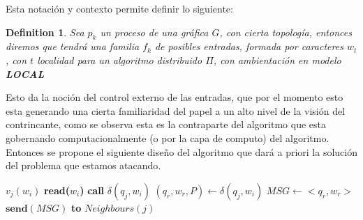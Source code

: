 \documentclass[10pt]{report}
\newtheorem{definition}{Definition}
\begin{document}
    Esta notación y contexto permite definir lo siguiente:
    \theoremstyle{definition}
    \begin{definition}
        Sea $p_{k}$ un proceso de una gráfica $G$, con cierta topología, entonces
        diremos que tendrá una familia $f_{k}$ de posibles entradas, formada por caracteres $w_{t}$, con $t$ localidad para un algoritmo
        distribuido $\Pi$, con ambientación en modelo \textbf{LOCAL}

    \end{definition}
    Esto da la noción del control externo de las entradas, que por el momento esto esta generando
    una cierta familiaridad del papel a un alto nivel de la visión del contrincante, como se observa
    esta es la contraparte del algoritmo que esta gobernando computacionalmente (o por la capa de computo)
    del algoritmo.
    \hfill
    Entonces se propone el siguiente diseño del algoritmo que dará a priori
    la solución del problema que estamos atacando.

    \begin{algorithm}
        \caption{$Simula\char95Algo\char95TM(w)$}\label{alg:simula}
        \begin{algorithmic}
                  \STATE $v_{j}(w_{i})$
                  \STATE \textbf{read($w_{i}$)}
                     \STATE \textbf{call} $\delta(q_{j},w_{i})$
                     \STATE $(q_{r},w_{r},P)\gets \delta(q_{j},w_{i})$
                  \ENDWHILE
                  \ENDIF
                  \ELSE
                       \STATE $MSG\gets<q_{r},w_{r}>$
                       \STATE $\textbf{send}(MSG)$ \textbf{to} $Neighbours(j)$ 
               \ENDFOR
        \end{algorithmic}
    \end{algorithm}
    \newline
\end{document}
